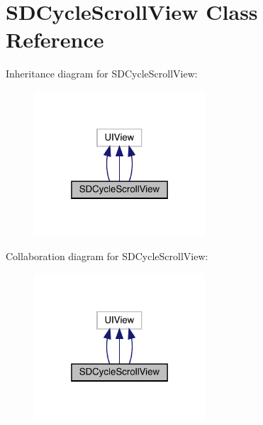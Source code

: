 \hypertarget{interface_s_d_cycle_scroll_view}{}\section{S\+D\+Cycle\+Scroll\+View Class Reference}
\label{interface_s_d_cycle_scroll_view}


Inheritance diagram for S\+D\+Cycle\+Scroll\+View\+:\nopagebreak
\begin{figure}[H]
\begin{center}
\leavevmode
\includegraphics[width=181pt]{interface_s_d_cycle_scroll_view__inherit__graph}
\end{center}
\end{figure}


Collaboration diagram for S\+D\+Cycle\+Scroll\+View\+:\nopagebreak
\begin{figure}[H]
\begin{center}
\leavevmode
\includegraphics[width=181pt]{interface_s_d_cycle_scroll_view__coll__graph}
\end{center}
\end{figure}
